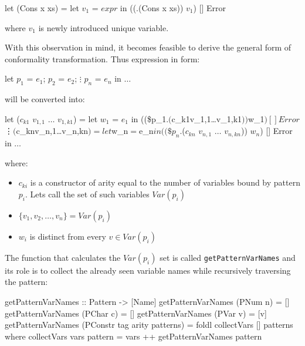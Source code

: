 \documentclass[12pt,a4paper]{report}
\begin{document}
\vspace*{0.2in}
\begin{code}[style=haskell,mathescape=true]
  let (Cons x xs) = let $v_{1}$ = $expr$
                    in ((\p.(Cons x xs)) $v_{1}$) [] Error
\end{code}

where $v_{1}$ is newly introduced unique variable.

With this observation in mind, it becomes feasible to derive the general form
of conformality transformation. Thus expression in form:

\vspace*{0.2in}
\begin{code}[style=haskell,mathescape=true]
  let $p_{1}$ = $e_{1}$;
      $p_{2}$ = $e_{2}$;
         $\vdots$
      $p_{n}$ = $e_{n}$
  in $\ldots$
\end{code}

will be converted into:

\vspace*{0.2in}
\begin{code}[style=haskell,mathescape=true]
  let
      ($c_{k1}$ $v_{1,1}$ $\ldots$ $v_{1,k1}$) = let $w_{1}$ = $e_{1}$
                        in ((\$p_{1}$.($c_{k1}$ $v_{1,1}$ $\ldots$ $v_{1,k1}$)) $w_{1}$) [] Error
                                 $\vdots$
      ($c_{kn}$ $v_{n,1}$ $\ldots$ $v_{n,kn}$) = let $w_{n}$ = $e_{n}$
                        in ((\$p_{n}$.($c_{kn}$ $v_{n,1}$ $\ldots$ $v_{n,kn}$)) $w_{n}$) [] Error
  in $\ldots$
\end{code}

where:
\begin{itemize}
  \item $c_{ki}$ is a constructor of arity equal to the number of variables
    bound by pattern $p_{i}$. Lets call the set of such variables $Var(p_{i})$
  \item $\{v_1, v_2, \ldots, v_n\} = Var(p_i)$
  \item $w_{i}$ is distinct from every $v \in Var(p_i)$
\end{itemize}
The function that calculates the $Var(p_i)$ set is called
\texttt{getPatternVarNames} and its role is to collect the already seen
variable names while recursively traversing the pattern:

\vspace*{0.2in}
\begin{code}[style=haskell]
  getPatternVarNames :: Pattern -> [Name]
  getPatternVarNames (PNum n) = []
  getPatternVarNames (PChar c) = []
  getPatternVarNames (PVar v) = [v]
  getPatternVarNames (PConstr tag arity patterns) = foldl collectVars [] patterns
      where
          collectVars vars pattern = vars ++ getPatternVarNames pattern
\end{code}
\end{document}
